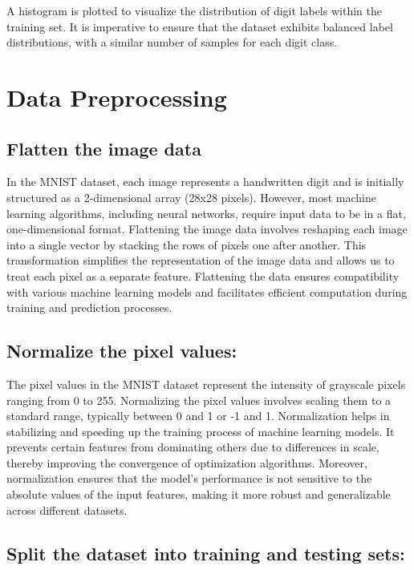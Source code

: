 A histogram is plotted to visualize the distribution of digit labels within the training set. It is imperative to ensure that the dataset exhibits balanced label distributions, with a similar number of samples for each digit class.

\section{Data Preprocessing}

\subsection{Flatten the image data}

In the MNIST dataset, each image represents a handwritten digit and is initially structured as a 2-dimensional array (28x28 pixels). However, most machine learning algorithms, including neural networks, require input data to be in a flat, one-dimensional format. Flattening the image data involves reshaping each image into a single vector by stacking the rows of pixels one after another. This transformation simplifies the representation of the image data and allows us to treat each pixel as a separate feature. Flattening the data ensures compatibility with various machine learning models and facilitates efficient computation during training and prediction processes.

\subsection{Normalize the pixel values:}

The pixel values in the MNIST dataset represent the intensity of grayscale pixels ranging from 0 to 255. Normalizing the pixel values involves scaling them to a standard range, typically between 0 and 1 or -1 and 1. Normalization helps in stabilizing and speeding up the training process of machine learning models. It prevents certain features from dominating others due to differences in scale, thereby improving the convergence of optimization algorithms. Moreover, normalization ensures that the model's performance is not sensitive to the absolute values of the input features, making it more robust and generalizable across different datasets.

\subsection{Split the dataset into training and testing sets:}

